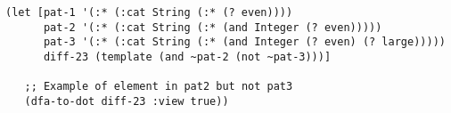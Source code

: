 \begin{lstlisting}[style=reclojureClojure]
(let [pat-1 '(:* (:cat String (:* (? even))))
      pat-2 '(:* (:cat String (:* (and Integer (? even)))))
      pat-3 '(:* (:cat String (:* (and Integer (? even) (? large)))))
      diff-23 (template (and ~pat-2 (not ~pat-3)))]

   ;; Example of element in pat2 but not pat3
   (dfa-to-dot diff-23 :view true))
\end{lstlisting}
